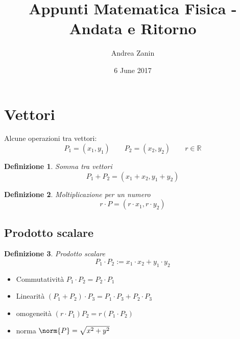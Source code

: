 \documentclass[10pt,a4paper]{article}
\author{Andrea Zanin}
\title{Appunti Matematica Fisica - Andata e Ritorno}
\date{6 June 2017}
\theoremstyle{plain}
\newtheorem{definizione}{Definizione}
\theoremstyle{definition}
\begin{document}
	\maketitle
	\section{Vettori}
	Alcune operazioni tra vettori:
	\[P_1=(x_1,y_1) \qquad P_2=(x_2,y_2)\qquad r \in \mathbb{R}\]
	\begin{definizione} Somma tra vettori
		\label{vec:sum}
		\[P_1 + P_2 = (x_1+x_2, y_1+y_2)\]
	\end{definizione}
	\begin{definizione} Moltiplicazione per un numero
		\label{vec:nprod}
		\[r\cdot P=(r\cdot x_1, r\cdot y_2)\]
	\end{definizione}
	\subsection{Prodotto scalare}
	\begin{definizione} Prodotto scalare
		\label{vec:sprod}
		\[P_1 \cdot P_2 := x_1 \cdot x_2 + y_1 \cdot y_2\]
	\end{definizione}
	\begin{itemize}
		\item Commutatività $P_1 \cdot P_2 = P_2 \cdot P_1$
		\item Linearità $(P_1 + P_2)\cdot P_3 = P_1 \cdot P_3 + P_2 \cdot P_3$
		\item omogeneità $(r\cdot P_1)P_2 = r(P_1 \cdot P_2)$
		\item norma $\norm{P}=\sqrt{x^2 + y^2}$
	\end{itemize}
\end{document}
